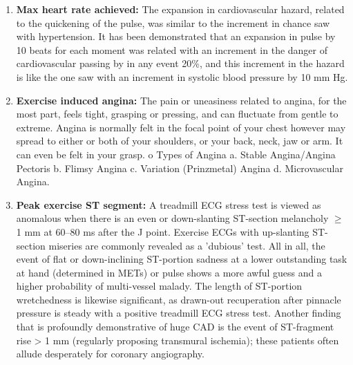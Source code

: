 \documentclass[oneside,12pt]{Classes/VTU}
\begin{document}
\begin{enumerate}
		\item \textbf{Max heart rate achieved:} The expansion in cardiovascular hazard, related to the quickening of the pulse, was similar to the increment in chance saw with hypertension. It has been demonstrated that an expansion in pulse by 10 beats for each moment was related with an increment in the danger of cardiovascular passing by in any event 20\%, and this increment in the hazard is like the one saw with an increment in systolic blood pressure by 10 mm Hg.
		
		\item \textbf{Exercise induced angina:} The pain or uneasiness related to angina, for the most part, feels tight, grasping or pressing, and can fluctuate from gentle to extreme. Angina is normally felt in the focal point of your chest however may spread to either or both of your shoulders, or your back, neck, jaw or arm. It can even be felt in your grasp. o Types of Angina a. Stable Angina/Angina Pectoris b. Flimsy Angina c. Variation (Prinzmetal) Angina d. Microvascular Angina.
		
		\item \textbf{Peak exercise ST segment:} A treadmill ECG stress test is viewed as anomalous when there is an even or down-slanting ST-section melancholy $\geq$ 1 mm at 60–80 ms after the J point. Exercise ECGs with up-slanting ST-section miseries are commonly revealed as a 'dubious' test. All in all, the event of flat or down-inclining ST-portion sadness at a lower outstanding task at hand (determined in METs) or pulse shows a more awful guess and a higher probability of multi-vessel malady. The length of ST-portion wretchedness is likewise significant, as drawn-out recuperation after pinnacle pressure is steady with a positive treadmill ECG stress test. Another finding that is profoundly demonstrative of huge CAD is the event of ST-fragment rise > 1 mm (regularly proposing transmural ischemia); these patients often allude desperately for coronary angiography.
	\end{enumerate}
\end{document}
